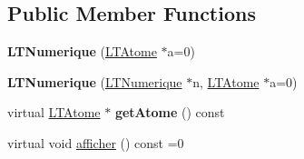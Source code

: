 \subsection*{Public Member Functions}
\begin{DoxyCompactItemize}
\item 
{\bfseries L\+T\+Numerique} (\hyperlink{class_l_t_atome}{L\+T\+Atome} $\ast$a=0)\hypertarget{class_l_t_numerique_afdba20ccf63d95ea51744804fbd712de}{}\label{class_l_t_numerique_afdba20ccf63d95ea51744804fbd712de}

\item 
{\bfseries L\+T\+Numerique} (\hyperlink{class_l_t_numerique}{L\+T\+Numerique} $\ast$n, \hyperlink{class_l_t_atome}{L\+T\+Atome} $\ast$a=0)\hypertarget{class_l_t_numerique_ada69a222a6bbcd5b2ef1b12106614448}{}\label{class_l_t_numerique_ada69a222a6bbcd5b2ef1b12106614448}

\item 
virtual \hyperlink{class_l_t_atome}{L\+T\+Atome} $\ast$ {\bfseries get\+Atome} () const \hypertarget{class_l_t_numerique_a92f56bd49c69390afba8321f189d282f}{}\label{class_l_t_numerique_a92f56bd49c69390afba8321f189d282f}

\item 
virtual void \hyperlink{class_l_t_numerique_a374425c7d4f14f7a4ac999a7048f7206}{afficher} () const  =0\hypertarget{class_l_t_numerique_a374425c7d4f14f7a4ac999a7048f7206}{}\label{class_l_t_numerique_a374425c7d4f14f7a4ac999a7048f7206}


\end{DoxyCompactItemize}
